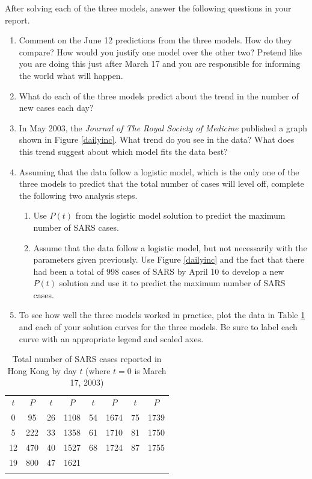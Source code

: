 \documentclass
[justified,nohyper]
{tufte-handout}
\begin{document}
After solving each of the three models, answer the following questions in your report.

\begin{enumerate}
  \item Comment on the June 12 predictions from the three models. How do they compare? How would you justify one model over the other two? Pretend like you are doing this just after March 17 and you are responsible for informing the world what will happen.
  \item What do each of the three models predict about the trend in the number of new cases each day?
  \item In May 2003, the \textit{Journal of The Royal Society of Medicine} published a graph shown in Figure \ref{dailyinc}. What trend do you see in the data? What does this trend suggest about which model fits the data best?


  \item Assuming that the data follow a logistic model, which is the only one of the three models to predict that the total number of cases will level off, complete the following two analysis steps.
  \begin{enumerate}
  \item Use $P(t)$ from the logistic model solution to predict the maximum number of SARS cases.
  \item Assume that the data follow a logistic model, but not necessarily with the parameters given previously. Use Figure \ref{dailyinc} and the fact that there had been a total of 998 cases of SARS by April 10 to develop a new $P(t)$ solution and use it to predict the maximum number of SARS cases.
\end{enumerate}

  \item To see how well the three models worked in practice, plot the data in Table \ref{sarscases} and each of your solution curves for the three models. Be sure to label each curve with an appropriate legend and scaled axes.
\end{enumerate}


\begin{fullwidth}
\begin{table}
\begin{tabular}{cccccccc}
    \toprule
    $t$ & $P$ & $t$ & $P$ & $t$ & $P$ & $t$ & $P$ \\
    \cmidrule(r){1-2}\cmidrule(r){3-4}\cmidrule(r){5-6}\cmidrule{7-8}
    0 & 95 & 26 & 1108 & 54 & 1674 & 75 & 1739 \\
    5 & 222 & 33 & 1358 & 61 & 1710 & 81 & 1750 \\
    12 & 470 & 40 & 1527 & 68 & 1724 & 87 & 1755 \\
    19 & 800 & 47 & 1621 & & &  \\
    \bottomrule
\caption{\label{sarscases} Total number of SARS cases reported in Hong Kong by day $t$ (where $t=0$ is March 17, 2003)}
\end{tabular}
\end{table}
\end{fullwidth}
\end{document}

